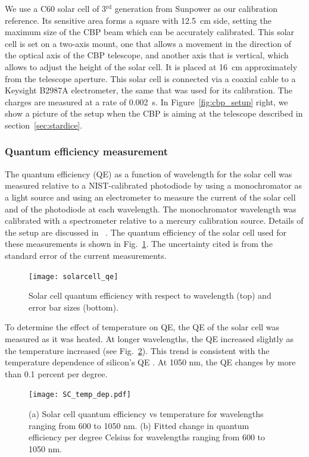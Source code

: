 We use a C60 solar cell of 3$^{\mathrm{rd}}$ generation from Sunpower as our calibration reference. Its sensitive area forms a square with \SI{12.5}{\centi\meter} side, setting the maximum size of the CBP beam which can be accurately calibrated. This solar cell is set on a two-axis mount, one that allows a movement in the direction of the optical axis of the CBP telescope, and another axis that is vertical, which allows to adjust the height of the solar cell. It is placed at \SI{16}{\cm} approximately from the telescope aperture. This solar cell is connected via a coaxial cable to a Keysight B2987A electrometer, the same that was used for its calibration. The charges are measured at a rate of \SI{0.002}{\second}. In Figure~\ref{fig:cbp_setup} right, we show a picture of the setup when the CBP is aiming at the \SD telescope described in section~\ref{sec:stardice}.


\subsubsection{Quantum efficiency measurement}
 
The quantum efficiency (QE) as a function of wavelength for the solar cell was measured relative to a NIST-calibrated photodiode by using a monochromator as a light source and using an electrometer to measure the current of the solar cell and of the photodiode at each wavelength. The monochromator wavelength was calibrated with a spectrometer relative to a mercury calibration source. Details of the setup are discussed in ~\cite{solarcell}. The quantum efficiency of the solar cell used for these measurements is shown in Fig.~\ref{fig:qe}.  The uncertainty cited is from the standard error of the current measurements.

\begin{figure}[!h]
\centering
\texttt{[image: solarcell\_qe]}
\caption{Solar cell quantum efficiency with respect to wavelength (top) and error bar sizes (bottom).}
\label{fig:qe}
\end{figure}

To determine the effect of temperature on QE, the QE of the solar cell was measured as it was heated. At longer wavelengths, the QE increased slightly as the temperature increased (see Fig.~\ref{fig:SC_temp}). This trend is consistent with the temperature dependence of silicon's QE \citep{Green_2008}. At 1050 nm, the QE changes by more than 0.1 percent per degree.
\begin{figure}[!h]
\centering
\texttt{[image: SC\_temp\_dep.pdf]}
\caption{(a) Solar cell quantum efficiency vs temperature for wavelengths ranging from 600 to 1050 nm. (b) Fitted change in quantum efficiency per degree Celsius for wavelengths ranging from 600 to 1050 nm.}
\label{fig:SC_temp}
\end{figure}

